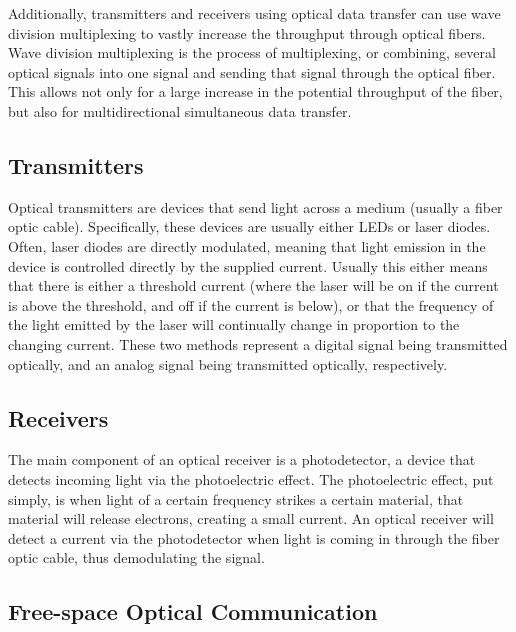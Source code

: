 \documentclass[11pt]{article}
\begin{document}
Additionally, transmitters and receivers using optical data transfer can use wave division multiplexing to vastly increase the throughput through optical fibers. Wave division multiplexing is the process of multiplexing, or combining, several optical signals into one signal and sending that signal through the optical fiber. This allows not only for a large increase in the potential throughput of the fiber, but also for multidirectional simultaneous data transfer. 

\subsection{Transmitters}

Optical transmitters are devices that send light across a medium (usually a fiber optic cable). Specifically, these devices are usually either LEDs or laser diodes. Often, laser diodes are directly modulated, meaning that light emission in the device is controlled directly by the supplied current. Usually this either means that there is either a threshold current (where the laser will be on if the current is above the threshold, and off if the current is below), or that the frequency of the light emitted by the laser will continually change in proportion to the changing current. These two methods represent a digital signal being transmitted optically, and an analog signal being transmitted optically, respectively. 

\subsection{Receivers}

The main component of an optical receiver is a photodetector, a device that detects incoming light via the photoelectric effect. The photoelectric effect, put simply, is when light of a certain frequency strikes a certain material, that material will release electrons, creating a small current. An optical receiver will detect a current via the photodetector when light is coming in through the fiber optic cable, thus demodulating the signal. 

\subsection{Free-space Optical Communication}
\end{document}
